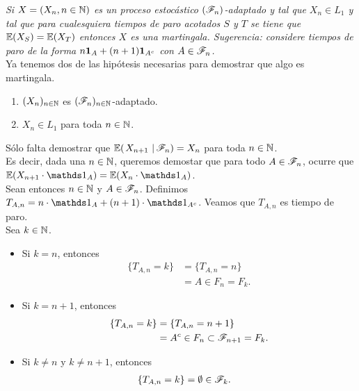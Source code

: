 \emph{
	Si $X=\left( X_n,n\in\mathbb{N}\right) $ es un proceso estoc\'astico $\left( \mathscr{F}_n\right) $-adaptado y tal que $X_n\in L_1$ y tal que 
	para cualesquiera tiempos de paro acotados $S$ y $T$ se tiene que $\mathbb{E}\! \left( X_S \right)=\mathbb{E}\! \left( X_T \right)$ entonces $X$ es una 
	martingala. Sugerencia: considere tiempos de paro de la forma $n{\bf{1}}_{A}+(n+1){\bf{1}}_{A^c}$ con $A\in\mathscr{F}_n$.\\
}
\afterstatement
	Ya tenemos dos de las hipótesis necesarias para demostrar que algo es martingala.
\begin{enumerate}
	\item 
		$(X_n)_{n\in\mathbb{N}}$ es $(\mathscr{F}_n)_{n \in \mathbb{N}}$-adaptado.

	\item 
		$X_n \in L_1$ para toda $n \in \mathbb{N}$. 
\end{enumerate}
\null

	Sólo falta demostrar que $\espc{X_{n+1}}{\F_n} = X_n$ para toda $n \in \mathbb{N}$.\\

	Es decir, dada una $n \in \mathbb{N}$, queremos demostar que para todo $A \in \mathscr{F}_n$,
ocurre que $\E(X_{n+1} \cdot \indic_{A}) = \E(X_{n} \cdot \indic_{A})$.\\

	Sean entonces $n \in \mathbb{N}$ y $A \in \mathscr{F}_n$. Definimos $T_{A,n} = n\cdot\indic_{A} + (n+1) \cdot \indic_{A^c}$. 
Veamos que $T_{A, n}$ es tiempo de paro.\\

	Sea $k \in \mathbb{N}$.

\begin{itemize}
	\item 
		Si $k = n$, entonces 
		\begin{align}
			\{T_{A, n} = k\} 	&= \{T_{A, n} = n\} \\
								&= A \in F_n = F_k.
		\end{align}
		
	\item
		Si $k = n + 1$, entonces 
		\begin{align}
			\{T_{A, n} = k\} 	&= \{T_{A, n} = n + 1\} \\
								&= A^c \in F_n \subset \mathscr{F}_{n+1} = F_k.
		\end{align}

	\item 
		Si $k \not= n$ y $k \not= n+1$, entonces
		\begin{align}
			\{T_{A, n} = k\} 	&= \emptyset \in \mathscr{F}_k.
		\end{align}
\end{itemize}

